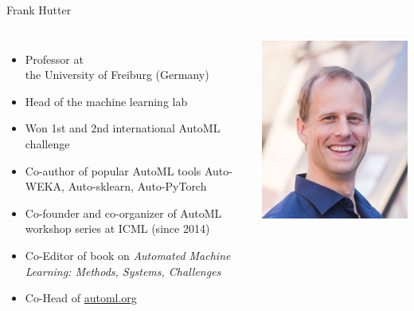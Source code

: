 \begin{frame}[c]{Frank Hutter}

\begin{columns}


\begin{itemize}
	\item Professor at\\ the University of Freiburg (Germany)
	\item Head of the machine learning lab
	\item Won 1st and 2nd international AutoML challenge
	\item Co-author of popular AutoML tools Auto-WEKA, Auto-sklearn, Auto-PyTorch
	\item Co-founder and co-organizer of AutoML workshop series at ICML (since 2014)
	\item Co-Editor of book on \textit{Automated Machine Learning:	Methods, Systems, Challenges}
	\item Co-Head of \url{automl.org}

\end{itemize}


\includegraphics[width=1.0\textwidth]{images/hutter.jpg}

\end{columns}

\end{frame}

